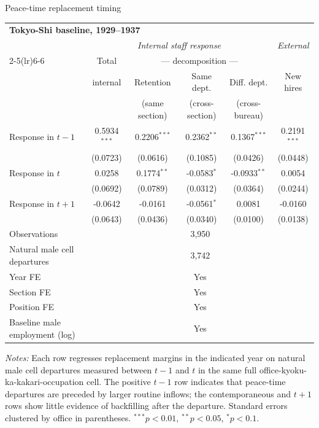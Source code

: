 \begin{frame}[t]{Peace-time replacement timing}
    \tiny
    \centering
    \begin{threeparttable}
    \begin{tabular}{lcccc|c}
        \toprule
        \multicolumn{6}{l}{\textbf{Tokyo-Shi baseline, 1929--1937}} \\[2pt]
        & \multicolumn{4}{c|}{\textit{Internal staff response}} & \textit{External} \\
        \cmidrule(lr){2-5}\cmidrule(lr){6-6}
         & Total & \multicolumn{3}{c|}{--- decomposition ---} & \\
         & internal & Retention & Same dept. & Diff. dept. & New hires \\
         &  & (same section) & (cross-section) & (cross-bureau) & \\
        \midrule
        Response in $t-1$ & 0.5934$^{***}$ & 0.2206$^{***}$ & 0.2362$^{**}$ & 0.1367$^{***}$ & 0.2191$^{***}$ \\
         & (0.0723) & (0.0616) & (0.1085) & (0.0426) & (0.0448) \\
        Response in $t$ & 0.0258 & 0.1774$^{**}$ & -0.0583$^{*}$ & -0.0933$^{**}$ & 0.0054 \\
         & (0.0692) & (0.0789) & (0.0312) & (0.0364) & (0.0244) \\
        Response in $t+1$ & -0.0642 & -0.0161 & -0.0561$^{*}$ & 0.0081 & -0.0160 \\
         & (0.0643) & (0.0436) & (0.0340) & (0.0100) & (0.0138) \\
        \midrule
        Observations & \multicolumn{5}{c}{3,950} \\
        Natural male cell departures & \multicolumn{5}{c}{3,742} \\
        Year FE & \multicolumn{5}{c}{Yes} \\
        Section FE & \multicolumn{5}{c}{Yes} \\
        Position FE & \multicolumn{5}{c}{Yes} \\
        Baseline male employment (log) & \multicolumn{5}{c}{Yes} \\
        \bottomrule
    \end{tabular}
    \begin{tablenotes}[flushleft]
        \tiny
        \item \textit{Notes:} Each row regresses replacement margins in the indicated year on natural male cell departures measured between $t-1$ and $t$ in the same full office-kyoku-ka-kakari-occupation cell. The positive $t-1$ row indicates that peace-time departures are preceded by larger routine inflows; the contemporaneous and $t+1$ rows show little evidence of backfilling after the departure. Standard errors clustered by office in parentheses. $^{***}p<0.01$, $^{**}p<0.05$, $^{*}p<0.1$.
    \end{tablenotes}
    \end{threeparttable}
\end{frame}
